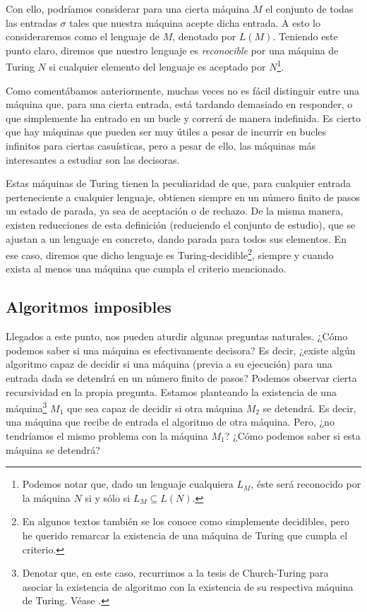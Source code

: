 Con ello, podríamos considerar para una cierta máquina $M$ el conjunto de todas las entradas $\sigma$ tales que nuestra máquina acepte dicha entrada. A esto lo consideraremos como el lenguaje de $M$, denotado 
por $L(M)$. Teniendo este punto claro, diremos que nuestro lenguaje es \textit{reconocible} por una máquina de Turing $N$ si cualquier elemento del lenguaje es aceptado por $N$\footnote{Podemos notar que, dado un 
lenguaje cualquiera $L_M$, éste será reconocido por la máquina $N$ si y sólo si $L_M \subseteq L(N)$.}.

Como comentábamos anteriormente, muchas veces no es fácil distinguir entre una máquina que, para una cierta entrada, está tardando demasiado en responder, o que simplemente ha entrado en un bucle y correrá de manera indefinida. 
Es cierto que hay máquinas que pueden ser muy útiles a pesar de incurrir en bucles infinitos para ciertas casuísticas, pero a pesar de ello, las máquinas más interesantes a estudiar son las decisoras.

Estas máquinas de Turing tienen la peculiaridad de que, para cualquier entrada perteneciente a cualquier lenguaje, obtienen siempre en un número finito de pasos un estado de parada, ya sea de aceptación o de rechazo.
De la misma manera, existen reducciones de esta definición (reduciendo el conjunto de estudio), que se ajustan a un lenguaje en concreto, dando parada para todos sus elementos. En ese caso, diremos que dicho lenguaje es 
Turing-decidible\footnote{En algunos textos también se los conoce como simplemente decidibles, pero he querido remarcar la existencia de una máquina de Turing que cumpla el criterio.}, siempre y cuando exista al menos 
una máquina que cumpla el criterio mencionado.

\subsection{Algoritmos imposibles}

Llegados a este punto, nos pueden aturdir algunas preguntas naturales. ¿Cómo podemos saber si una máquina es efectivamente decisora? Es decir, ¿existe algún algoritmo capaz de decidir si una máquina (previa a su ejecución)
para una entrada dada se detendrá en un número finito de pasos? Podemos observar cierta recursividad en la propia pregunta. Estamos planteando la existencia de una máquina\footnote{Denotar que, en este caso, recurrimos a la tesis
de Church-Turing para asociar la existencia de algoritmo con la existencia de su respectiva máquina de Turing. Véase \cite{copeland1997church}.} $M_1$ que sea capaz de decidir si otra máquina $M_2$ se detendrá. Es decir, 
una máquina que recibe de entrada el algoritmo de otra máquina. Pero, ¿no tendríamos el mismo problema con la máquina $M_1$? ¿Cómo podemos saber si esta máquina se detendrá?

